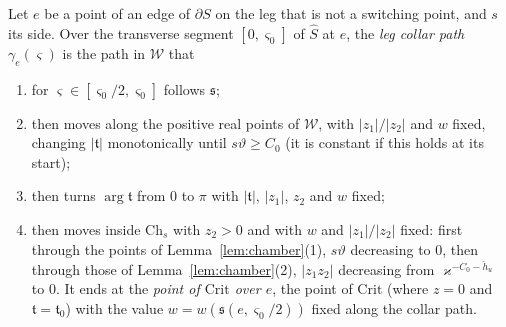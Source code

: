 \begin{definition}\label{def:collarpath}
Let $e$ be a point of an edge of $\partial S$ on the leg that is not a switching point, and $s$ its side. Over the
transverse segment $[0,\varsigma_0]$ of $\hat S$ at $e$, the \emph{leg collar path} $\gamma_e(\varsigma)$ is the path in $\mathscr W$
that
\begin{enumerate}
\item[(i)] for $\varsigma\in[\varsigma_0/2,\varsigma_0]$ follows $\mathfrak s$;
\item[(ii)] then moves along the positive real points of $\mathscr W$, with $|z_1|/|z_2|$ and $w$ fixed, changing $|\mathfrak t|$
monotonically until $s\vartheta\ge C_0$ (it is constant if this holds at its start);
\item[(iii)] then turns $\arg\mathfrak t$ from $0$ to $\pi$ with $|\mathfrak t|$, $|z_1|$, $z_2$ and $w$ fixed;
\item[(iv)] then moves inside $\mathrm{Ch}_s$ with $z_2>0$ and with $w$ and $|z_1|/|z_2|$ fixed: first through the
points of Lemma~\ref{lem:chamber}(1), $s\vartheta$ decreasing to $0$, then through those of
Lemma~\ref{lem:chamber}(2), $|z_1z_2|$ decreasing from $\varkappa^{-C_0-\check h_u}$ to $0$. It ends at the \emph{point of
$\mathrm{Crit}$ over $e$}, the point of $\mathrm{Crit}$ (where $z=0$ and $\mathfrak t=\mathfrak t_0$) with the value
$w=w(\mathfrak s(e,\varsigma_0/2))$ fixed along the collar path.
\end{enumerate}
\end{definition}

